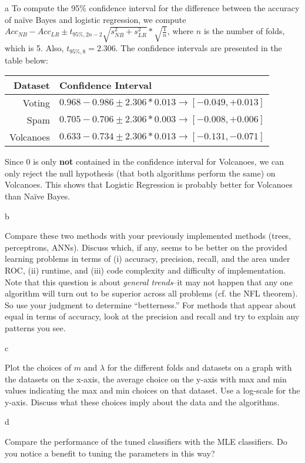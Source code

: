 \documentclass[fleqn]{homework}
\begin{document}
\begin{problem}{a}
    To compute the 95\% confidence interval for the difference between the
    accuracy of na\"ive Bayes and logistic regression, we compute
    $Acc_{NB} - Acc_{LR} \pm t_{95\%,2n-2} \sqrt{s_{NB}^2 + s_{LR}^2} *
    \sqrt{\frac{1}{n}}$,
    where $n$ is the number of folds, which is 5.  Also, $t_{95\%,8} = 2.306$.
    The confidence intervals are presented in the table below:

    \vspace{0.3cm}
    \begin{tabular}{rl}
      \hline
      Dataset & Confidence Interval \\
      \hline
      Voting & $0.968 - 0.986 \pm 2.306 * 0.013 \to [-0.049, +0.013]$ \\
      Spam & $0.705 - 0.706 \pm 2.306 * 0.003 \to [-0.008, +0.006]$ \\
      Volcanoes & $0.633 - 0.734 \pm 2.306 * 0.013 \to [-0.131, -0.071]$ \\
      \hline
    \end{tabular}
    \vspace{0.3cm}

    Since 0 is only \textbf{not} contained in the confidence interval for
    Volcanoes, we can only reject the null hypothesis (that both algorithms
    perform the same) on Volcanoes.  This shows that Logistic Regression is
    probably better for Volcanoes than Na\"ive Bayes.

  \end{problem}

  \begin{problem}{b}
    \begin{question}
      Compare these two methods with your previously implemented methods (trees,
      perceptrons, ANNs).  Discuss which, if any, seems to be better on the
      provided learning problems in terms of (i) accuracy, precision, recall,
      and the area under ROC, (ii) runtime, and (iii) code complexity and
      difficulty of implementation.  Note that this question is about
      \textit{general trends}--it may not happen that any one algorithm will
      turn out to be superior across all problems (cf. the NFL theorem).  So use
      your judgment to determine ``betterness.''  For methods that appear about
      equal in terms of accuracy, look at the precision and recall and try to
      explain any patterns you see.
    \end{question}
  \end{problem}

  \begin{problem}{c}
    \begin{question}
      Plot the choices of $m$ and $\lambda$ for the different folds and datasets
      on a graph with the datasets on the x-axis, the average choice on the
      y-axis with max and min values indicating the max and min choices on that
      dataset.  Use a log-scale for the y-axis.  Discuss what these choices
      imply about the data and the algorithms.
    \end{question}
  \end{problem}

  \begin{problem}{d}
    \begin{question}
      Compare the performance of the tuned classifiers with the MLE classifiers.
      Do you notice a benefit to tuning the parameters in this way?
    \end{question}
  \end{problem}
\end{document}
